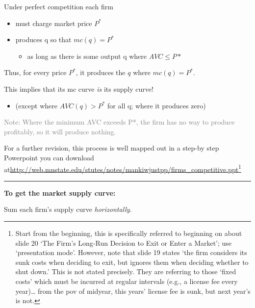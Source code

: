 \documentclass[]{article}
\providecommand{\tightlist}{%
  \setlength{\itemsep}{0pt}\setlength{\parskip}{0pt}}
\begin{document}
Under perfect competition each firm

\begin{itemize}
\tightlist
\item
  must charge market price \(P^*\)
\item
  produces q so that \(mc(q)=P^*\)

  \begin{itemize}
  \tightlist
  \item
    as long as there is some output q where \(AVC \leq P*\)
  \end{itemize}
\end{itemize}

\bigskip

Thus, for every price \(P^{*}\), it produces the \(q\) where
\(mc(q)=P^{*}\).

\bigskip

This implies that its mc curve \emph{is} its supply curve!\\

\begin{itemize}
\tightlist
\item
  (except where \(AVC(q)>P^*\) for all q; where it produces zero)
\end{itemize}

\textcolor{gray}{Note: Where the minimum AVC exceeds P*, the firm has no way to produce profitably, so it will produce nothing.}

For a further revision, this process is well mapped out in a step-by
step Powerpoint you can download
at\url{http://web.mnstate.edu/stutes/notes/mankiwjustpp/firms_competitive.ppt}\footnote{Start
  from the beginning, this is specifically referred to beginning on
  about slide 20 `The Firm's Long-Run Decision to Exit or Enter a
  Market'; use `presentation mode'. However, note that slide 19 states
  `the firm considers its sunk costs when deciding to exit, but ignores
  them when deciding whether to shut down.' This is not stated
  precisely. They are referring to those `fixed costs' which must be
  incurred at regular intervals (e.g., a license fee every year)\ldots{}
  from the pov of midyear, this years' license fee is sunk, but next
  year's is not.}

\begin{center}\rule{0.5\linewidth}{\linethickness}\end{center}

\textbf{To get the market supply curve:}

Sum each firm's supply curve \emph{horizontally}.
\end{document}
